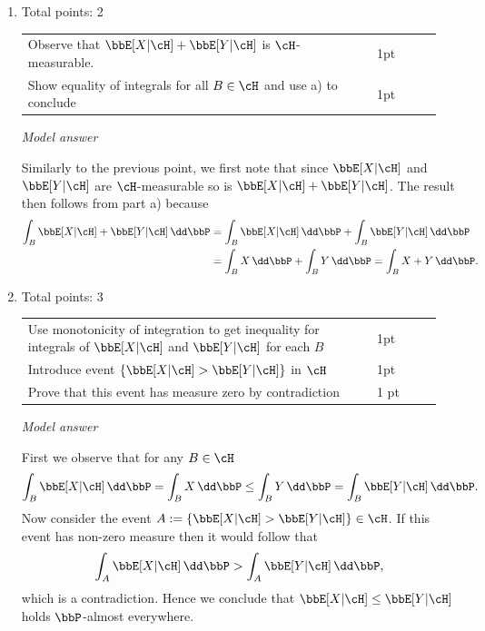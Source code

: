 \documentclass{lecturenotes}
\begin{document}
\begin{enumerate}[label={(\alph*)}]
\item Total points: 2\hfill

\begin{tabular}{p{0.8\linewidth}p{0.15\linewidth}}
\hline
Observe that $\bbE[X | \cH] + \bbE[Y | \cH]$ is $\cH$-measurable. & 1pt\\
Show equality of integrals for all $B \in \cH$ and use a) to conclude & 1pt\\
\hline
\end{tabular}

\textit{Model answer}

Similarly to the previous point, we first note that since $\bbE[X | \cH]$ and $\bbE[Y | \cH]$ are $\cH$-measurable so is $\bbE[X | \cH] + \bbE[Y | \cH]$. The result then follows from part a) because
\begin{align*}
	\int_B \bbE[X | \cH] + \bbE[Y | \cH] \, \dd \bbP 
	&= \int_B \bbE[X | \cH] \, \dd \bbP + \int_B \bbE[Y | \cH] \, \dd \bbP \\
	&= \int_B X \, \dd \bbP + \int_B Y \, \dd \bbP = \int_B X + Y \, \dd \bbP.
\end{align*}

\item Total points: 3\hfill

\begin{tabular}{p{0.8\linewidth}p{0.15\linewidth}}
\hline
Use monotonicity of integration to get inequality for integrals of $\bbE[X | \cH]$ and $\bbE[Y | \cH]$ for each $B$ & 1pt\\
Introduce event $\{ \bbE[X | \cH] > \bbE[Y | \cH]\}$ in $\cH$ & 1pt\\
Prove that this event has measure zero by contradiction & 1 pt\\
\hline
\end{tabular}

\textit{Model answer}


First we observe that for any $B \in \cH$
\[
	\int_B \bbE[X | \cH] \, \dd \bbP = \int_B X \, \dd \bbP \le \int_B Y \, \dd \bbP = \int_B \bbE[Y | \cH] \, \dd \bbP.
\]
Now consider the event $A := \{ \bbE[X | \cH] > \bbE[Y | \cH]\} \in \cH$. If this event has non-zero measure then it would follow that
\[
	\int_A \bbE[X | \cH] \, \dd \bbP > \int_A \bbE[Y | \cH] \, \dd \bbP,
\]
which is a contradiction. Hence we conclude that $\bbE[X | \cH] \le \bbE[Y | \cH]$ holds $\bbP$-almost everywhere.
\end{enumerate}
\end{document}
